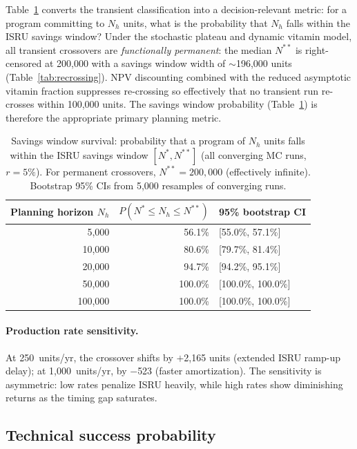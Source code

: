 \documentclass[preprint,12pt]{elsarticle}
\begin{document}
Table~\ref{tab:savings_survival} converts the transient classification into a decision-relevant metric: for a program committing to $N_h$ units, what is the probability that $N_h$ falls within the ISRU savings window? Under the stochastic plateau and dynamic vitamin model, all transient crossovers are \emph{functionally permanent}: the median $N^{**}$ is right-censored at 200{,}000 with a savings window width of ${\sim}$196{,}000 units (Table~\ref{tab:recrossing}). NPV discounting combined with the reduced asymptotic vitamin fraction suppresses re-crossing so effectively that no transient run re-crosses within 100{,}000 units. The savings window probability (Table~\ref{tab:savings_survival}) is therefore the appropriate primary planning metric.

\begin{table}[htbp]
\centering
\caption{Savings window survival: probability that a program of $N_h$ units falls within the ISRU savings window $[N^*, N^{**}]$ (all converging MC runs, $r = 5\%$). For permanent crossovers, $N^{**} = 200{,}000$ (effectively infinite). Bootstrap 95\% CIs from 5{,}000 resamples of converging runs.}
\label{tab:savings_survival}
\small
\begin{tabular}{@{}rrl@{}}
\toprule
Planning horizon $N_h$ & $P(N^* \leq N_h \leq N^{**})$ & 95\% bootstrap CI \\
\midrule
5{,}000   & 56.1\% & [55.0\%, 57.1\%] \\
10{,}000  & 80.6\% & [79.7\%, 81.4\%] \\
20{,}000  & 94.7\% & [94.2\%, 95.1\%] \\
50{,}000  & 100.0\% & [100.0\%, 100.0\%] \\
100{,}000 & 100.0\% & [100.0\%, 100.0\%] \\
\bottomrule
\end{tabular}
\end{table}

\paragraph{Production rate sensitivity.} At 250~units/yr, the crossover shifts by $+$2{,}165 units (extended ISRU ramp-up delay); at 1{,}000~units/yr, by $-$523 (faster amortization). The sensitivity is asymmetric: low rates penalize ISRU heavily, while high rates show diminishing returns as the timing gap saturates.

\subsection{Technical success probability}
\label{sec:success_probability}
\end{document}

